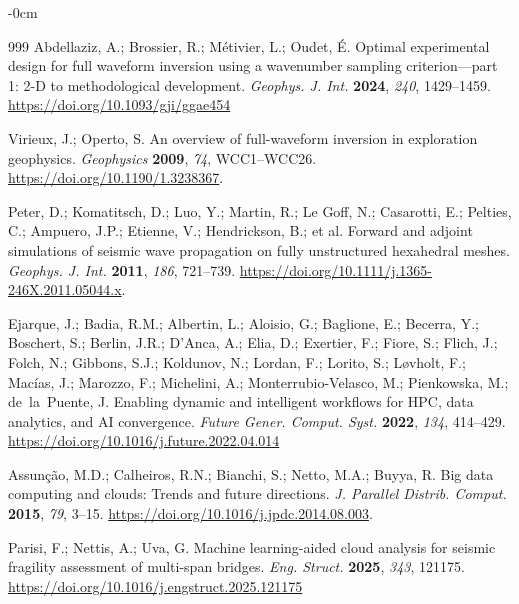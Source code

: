 \documentclass[data,article,accept,pdftex,moreauthors]{Definitions/mdpi}
\begin{document}
\begin{adjustwidth}{-\extralength}{0cm}
\begin{thebibliography}{999}
Abdellaziz, A.; Brossier, R.; M{\'e}tivier, L.; Oudet, {\'E}. Optimal experimental design for full waveform inversion using a wavenumber sampling criterion---part 1: 2-D to methodological development. \emph{Geophys. J. Int.} \textbf{2024}, \emph{240}, 1429--1459. \url{https://doi.org/10.1093/gji/ggae454}

Virieux, J.; Operto, S. An overview of full-waveform inversion in exploration geophysics. \emph{Geophysics} \textbf{2009}, \emph{74}, WCC1--WCC26. \url{https://doi.org/10.1190/1.3238367}.

Peter, D.; Komatitsch, D.; Luo, Y.; Martin, R.; Le Goff, N.; Casarotti, E.; Pelties, C.; Ampuero, J.P.; Etienne, V.; Hendrickson, B.; et al. Forward and adjoint simulations of seismic wave propagation on fully unstructured hexahedral meshes. \emph{Geophys. J. Int.} \textbf{2011}, \emph{186}, 721--739. \url{https://doi.org/10.1111/j.1365-246X.2011.05044.x}.

Ejarque, J.; Badia, R.M.; Albertin, L.; Aloisio, G.; Baglione, E.; Becerra, Y.; Boschert, S.; Berlin, J.R.; D'Anca, A.; Elia, D.; Exertier, F.; Fiore, S.; Flich, J.; Folch, N.; Gibbons, S.J.; Koldunov, N.; Lordan, F.; Lorito, S.; L{\o}vholt, F.; Mac{\'i}as, J.; Marozzo, F.; Michelini, A.; Monterrubio-Velasco, M.; Pienkowska, M.; de~la~Puente, J. Enabling dynamic and intelligent workflows for HPC, data analytics, and AI convergence. \emph{Future Gener. Comput. Syst.} \textbf{2022}, \emph{134}, 414--429. \url{https://doi.org/10.1016/j.future.2022.04.014}

Assunção, M.D.; Calheiros, R.N.; Bianchi, S.; Netto, M.A.; Buyya, R. Big data computing and clouds: Trends and future directions. \emph{J. Parallel Distrib. Comput.} \textbf{2015}, \emph{79}, 3--15. \url{https://doi.org/10.1016/j.jpdc.2014.08.003}.

Parisi, F.; Nettis, A.; Uva, G. Machine learning-aided cloud analysis for seismic fragility assessment of multi-span bridges. \emph{Eng. Struct.} \textbf{2025}, \emph{343}, 121175. \url{https://doi.org/10.1016/j.engstruct.2025.121175}


\end{thebibliography}
\end{adjustwidth}
\end{document}
